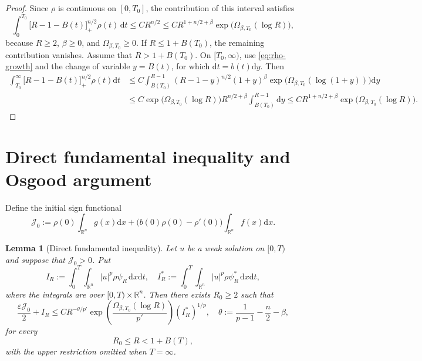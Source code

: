 \documentclass[11pt,reqno]{amsart}
\newtheorem{lemma}[theorem]{Lemma}
\theoremstyle{definition}
\theoremstyle{remark}
\begin{document}
	\begin{proof}
		Since $\rho$ is continuous on $[0,T_0]$, the contribution of this interval satisfies
		$$
		\int_0^{T_0}
		\bigl[R-1-B(t)\bigr]_+^{n/2}\rho(t)\,\mathrm{d}t
		\leq C R^{n/2}
		\leq C R^{1+n/2+\beta}
		\exp\bigl(\Omega_{\beta,T_0}(\log R)\bigr),
		$$
		because $R\geq2$, $\beta\geq0$, and $\Omega_{\beta,T_0}\geq0$. If $R\leq1+B(T_0)$, the remaining contribution vanishes. Assume
		that $R>1+B(T_0)$. On $[T_0,\infty)$, use \eqref{eq:rho-growth} and the
		change of variable $y=B(t)$, for which $\mathrm{d}t=b(t)\mathrm{d}y$.
		Then
		\begin{align*}
			\int_{T_0}^\infty
			\bigl[R-1-B(t)\bigr]_+^{n/2}\rho(t)\mathrm{d}t &\leq C\int_{B(T_0)}^{R-1}
			(R-1-y)^{n/2}(1+y)^\beta
			\exp\bigl(\Omega_{\beta,T_0}(\log(1+y))\bigr)\mathrm{d}y\\
			&\leq C\exp\bigl(\Omega_{\beta,T_0}(\log R)\bigr)
			R^{n/2+\beta}\int_{B(T_0)}^{R-1}\mathrm{d}y\leq CR^{1+n/2+\beta}
			\exp\bigl(\Omega_{\beta,T_0}(\log R)\bigr).
		\end{align*}
	\end{proof}
	
	\section{Direct fundamental inequality and Osgood argument} \label{sec:fundamental-osgood}
	
	Define the initial sign functional
	$$
	\mathcal{J}_0:=\rho(0)\int_{\mathbb{R}^n}g(x)\mathrm{d}x
	+\bigl(b(0)\rho(0)-\rho'(0)\bigr)
	\int_{\mathbb{R}^n}f(x)\mathrm{d}x.
	$$
	
	\begin{lemma}[Direct fundamental inequality]
		\label{lem:fundamental}
		Let $u$ be a weak solution on $[0,T)$ and suppose that $\mathcal{J}_0>0$. Put
		$$
		I_R:=\int_0^T\int_{\mathbb{R}^n} |u|^p\rho\psi_R\,\mathrm{d}x\mathrm{d}t,
		\quad
		I_R^*:=\int_0^T\int_{\mathbb{R}^n} |u|^p\rho\psi_R^*\,\mathrm{d}x\mathrm{d}t,
		$$
		where the integrals are over $[0,T)\times\mathbb{R}^n$. Then there exists $R_0\geq2$ such that
		\begin{equation}
			\label{eq:fundamental}
			\frac{\varepsilon\mathcal{J}_0}{2}+I_R
			\leq
			CR^{-\theta/p'}
			\exp\left(\frac{\Omega_{\beta,T_0}(\log R)}{p'}\right)
			(I_R^*)^{1/p},
			\quad
			\theta:=\frac{1}{p-1}-\frac{n}{2}-\beta,
		\end{equation}
		for every
		$$
		R_0\leq R<1+B(T),
		$$
		with the upper restriction omitted when $T=\infty$.
	\end{lemma}
	
\end{document}
